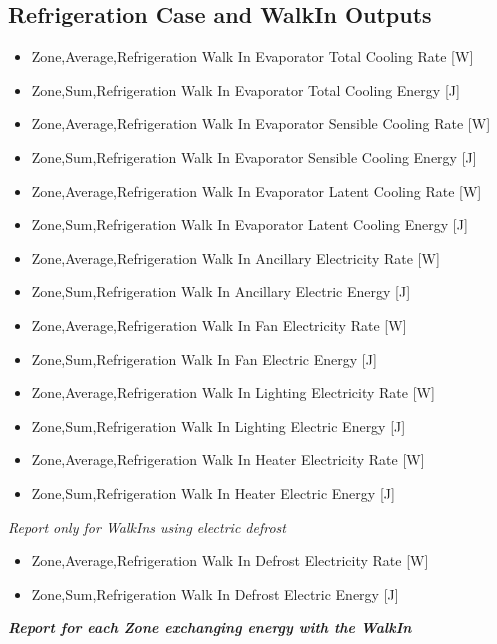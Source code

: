 \subsection{Refrigeration Case and WalkIn Outputs}\label{refrigeration-case-and-walkin-outputs}

\begin{itemize}
\item
  Zone,Average,Refrigeration Walk In Evaporator Total Cooling Rate {[}W{]}
\item
  Zone,Sum,Refrigeration Walk In Evaporator Total Cooling Energy {[}J{]}
\item
  Zone,Average,Refrigeration Walk In Evaporator Sensible Cooling Rate {[}W{]}
\item
  Zone,Sum,Refrigeration Walk In Evaporator Sensible Cooling Energy {[}J{]}
\item
  Zone,Average,Refrigeration Walk In Evaporator Latent Cooling Rate {[}W{]}
\item
  Zone,Sum,Refrigeration Walk In Evaporator Latent Cooling Energy {[}J{]}
\item
  Zone,Average,Refrigeration Walk In Ancillary Electricity Rate {[}W{]}
\item
  Zone,Sum,Refrigeration Walk In Ancillary Electric Energy {[}J{]}
\item
  Zone,Average,Refrigeration Walk In Fan Electricity Rate {[}W{]}
\item
  Zone,Sum,Refrigeration Walk In Fan Electric Energy {[}J{]}
\item
  Zone,Average,Refrigeration Walk In Lighting Electricity Rate {[}W{]}
\item
  Zone,Sum,Refrigeration Walk In Lighting Electric Energy {[}J{]}
\item
  Zone,Average,Refrigeration Walk In Heater Electricity Rate {[}W{]}
\item
  Zone,Sum,Refrigeration Walk In Heater Electric Energy {[}J{]}
\end{itemize}

\emph{Report only for WalkIns using electric defrost}

\begin{itemize}
\item
  Zone,Average,Refrigeration Walk In Defrost Electricity Rate {[}W{]}
\item
  Zone,Sum,Refrigeration Walk In Defrost Electric Energy {[}J{]}
\end{itemize}

\textbf{\emph{Report for each Zone exchanging energy with the WalkIn}}

